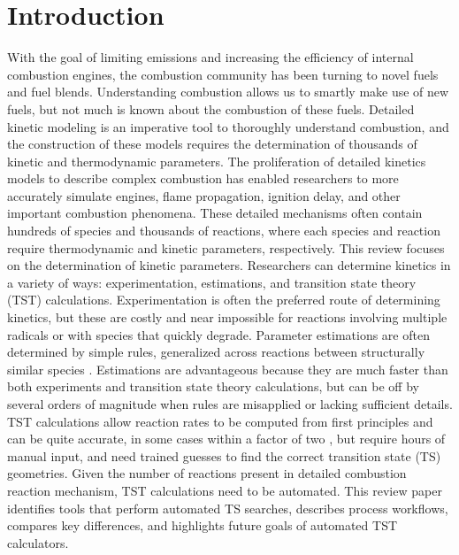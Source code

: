 \documentclass[preprint, 11pt]{elsarticle} %
\begin{document}
\section{Introduction}
% 
With the goal of limiting emissions and increasing the efficiency of internal combustion engines, the combustion community has been turning to novel fuels and fuel blends.
Understanding combustion allows us to smartly make use of new fuels, but not much is known about the combustion of these fuels.
Detailed kinetic modeling is an imperative tool to thoroughly understand combustion, and the construction of these models requires the determination of thousands of kinetic and thermodynamic parameters.
The proliferation of detailed kinetics models to describe complex combustion has enabled researchers to more accurately simulate engines, flame propagation, ignition delay, and other important combustion phenomena. 
These detailed mechanisms often contain hundreds of species and thousands of reactions, where each species and reaction require thermodynamic and kinetic parameters, respectively. 
This review focuses on the determination of kinetic parameters.
Researchers can determine kinetics in a variety of ways: experimentation, estimations, and transition state theory (TST) calculations.
Experimentation is often the preferred route of determining kinetics, but these are costly and near impossible for reactions involving multiple radicals or with species that quickly degrade.
Parameter estimations are often determined by simple rules, generalized across reactions between structurally similar species \cite{Curran:1998bx}. 
Estimations are advantageous because they are much faster than both experiments and transition state theory calculations, but can be off by several orders of magnitude when rules are misapplied or lacking sufficient details. 
TST calculations allow reaction rates to be computed from first principles and can be quite accurate, in some cases within a factor of two \cite{Klippenstein:2017eu}, but require hours of manual input, and need trained guesses to find the correct transition state (TS) geometries. 
Given the number of reactions present in detailed combustion reaction mechanism, TST calculations need to be automated.
This review paper identifies tools that perform automated TS searches, describes process workflows, compares key differences, and highlights future goals of automated TST calculators.

\end{document}
